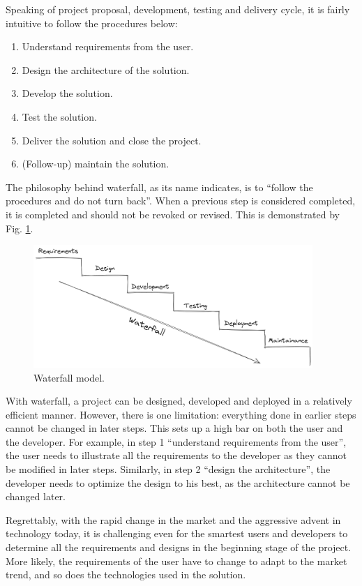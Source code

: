 Speaking of project proposal, development, testing and delivery cycle, it is fairly intuitive to follow the procedures below:
\begin{enumerate}
	\item Understand requirements from the user.
	\item Design the architecture of the solution.
	\item Develop the solution.
	\item Test the solution.
	\item Deliver the solution and close the project.
	\item (Follow-up) maintain the solution.
\end{enumerate}
The philosophy behind waterfall, as its name indicates, is to ``follow the procedures and do not turn back''. When a previous step is considered completed, it is completed and should not be revoked or revised. This is demonstrated by Fig. \ref{ch:cicd:fig:waterfall}.
\begin{figure}[htbp]
	\centering
	\includegraphics[width=300pt]{chapters/ap/figures/waterfall.png}
	\caption{Waterfall model.} \label{ch:cicd:fig:waterfall}
\end{figure}

With waterfall, a project can be designed, developed and deployed in a relatively efficient manner. However, there is one limitation: everything done in earlier steps cannot be changed in later steps. This sets up a high bar on both the user and the developer. For example, in step 1 ``understand requirements from the user'', the user needs to illustrate all the requirements to the developer as they cannot be modified in later steps. Similarly, in step 2 ``design the architecture'', the developer needs to optimize the design to his best, as the architecture cannot be changed later.

Regrettably, with the rapid change in the market and the aggressive advent in technology today, it is challenging even for the smartest users and developers to determine all the requirements and designs in the beginning stage of the project. More likely, the requirements of the user have to change to adapt to the market trend, and so does the technologies used in the solution.

